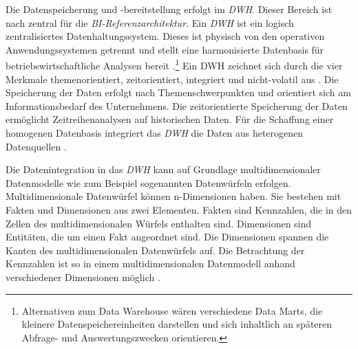 Die Datenspeicherung und -bereitstellung erfolgt im \textit{\acrshort{DWH}}. Dieser Bereich ist nach \citeauthor{linden_geschaftsmodellbasierte_2016} zentral für die 
\textit{\acrshort{BI}-Referenzarchitektur}\cite[vgl.][135]{linden_geschaftsmodellbasierte_2016}. Ein \textit{\acrlong{DWH}} ist ein logisch zentralisiertes Datenhaltungssystem. Dieses ist physisch 
von den operativen Anwendungssystemen getrennt und stellt eine harmonisierte Datenbasis für betriebswirtschaftliche Analysen bereit \cite[vgl.][135]{mucksch_data_2000}.\footnote{ Alternativen zum Data Warehouse wären verschiedene Data Marts, 
die kleinere Datenspeichereinheiten darstellen und sich inhaltlich an späteren Abfrage- und Auswertungszwecken orientieren.} 
Ein \acrlong{DWH} zeichnet sich durch die vier Merkmale themenorientiert, zeitorientiert, integriert und nicht-volatil aus \cites[vgl.][29 f.]{inmon_building_nodate_2005}[vgl.][271 f.]{abts_grundkurs_2017}[vgl.][136 f. ]{linden_geschaftsmodellbasierte_2016}. Die Speicherung der Daten erfolgt nach Themenschwerpunkten und
orientiert sich am Informationsbedarf des Unternehmens. Die zeitorientierte Speicherung der Daten ermöglicht Zeitreihenanalysen auf historischen Daten. 
Für die Schaffung einer homogenen Datenbasis integriert das \textit{\acrshort{DWH}} die Daten aus heterogenen Datenquellen \cite[vgl.][136]{linden_geschaftsmodellbasierte_2016}.

Die Datenintegration in das \textit{\acrlong{DWH}} kann auf Grundlage  multidimensionaler Datenmodelle wie zum Beispiel sogenannten Datenwürfeln erfolgen. 
Multidimensionale Datenwürfel können n-Dimensionen haben. Sie bestehen mit Fakten und Dimensionen aus zwei Elementen. 
Fakten sind Kennzahlen, die in den Zellen des multidimensionalen Würfels enthalten sind.
Dimensionen sind Entitäten, die um einen Fakt angeordnet sind. Die Dimensionen spannen die Kanten des multidimensionalen Datenwürfels auf.
Die Betrachtung der Kennzahlen ist so in einem multidimensionalen Datenmodell anhand verschiedener Dimensionen möglich 
\cites[vgl.][13 ff., 21 f.]{farkisch_data-warehouse-systeme_2011}[vgl.][66 f.]{kemper_business_2010}.

